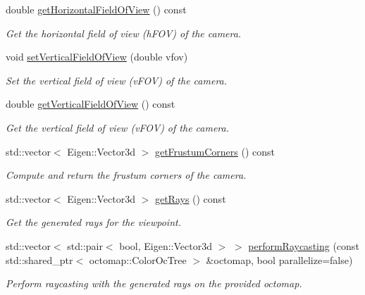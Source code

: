 \begin{DoxyCompactItemize}
double \hyperlink{classvisioncraft_1_1Viewpoint_aa59433b34ceeb80ec93ae23ba07ead02}{get\+Horizontal\+Field\+Of\+View} () const
\begin{DoxyCompactList}\small\item\em Get the horizontal field of view (h\+F\+OV) of the camera. \end{DoxyCompactList}\item 
void \hyperlink{classvisioncraft_1_1Viewpoint_a3c2c3034d8bab1520d95baff61ed3ec0}{set\+Vertical\+Field\+Of\+View} (double vfov)
\begin{DoxyCompactList}\small\item\em Set the vertical field of view (v\+F\+OV) of the camera. \end{DoxyCompactList}\item 
double \hyperlink{classvisioncraft_1_1Viewpoint_a40e3661d2b20eedcefac03fb9859522f}{get\+Vertical\+Field\+Of\+View} () const
\begin{DoxyCompactList}\small\item\em Get the vertical field of view (v\+F\+OV) of the camera. \end{DoxyCompactList}\item 
std\+::vector$<$ Eigen\+::\+Vector3d $>$ \hyperlink{classvisioncraft_1_1Viewpoint_a132ae1cc1c72958cb1d0c44aade4da9c}{get\+Frustum\+Corners} () const
\begin{DoxyCompactList}\small\item\em Compute and return the frustum corners of the camera. \end{DoxyCompactList}\item 
std\+::vector$<$ Eigen\+::\+Vector3d $>$ \hyperlink{classvisioncraft_1_1Viewpoint_a92bbbaf4c8071bce5e6bc5af99500886}{get\+Rays} () const
\begin{DoxyCompactList}\small\item\em Get the generated rays for the viewpoint. \end{DoxyCompactList}\item 
std\+::vector$<$ std\+::pair$<$ bool, Eigen\+::\+Vector3d $>$ $>$ \hyperlink{classvisioncraft_1_1Viewpoint_a4f9f78eb518386325d8e0ade57c90fc3}{perform\+Raycasting} (const std\+::shared\+\_\+ptr$<$ octomap\+::\+Color\+Oc\+Tree $>$ \&octomap, bool parallelize=false)
\begin{DoxyCompactList}\small\item\em Perform raycasting with the generated rays on the provided octomap. \end{DoxyCompactList}\item 

\end{DoxyCompactItemize}
